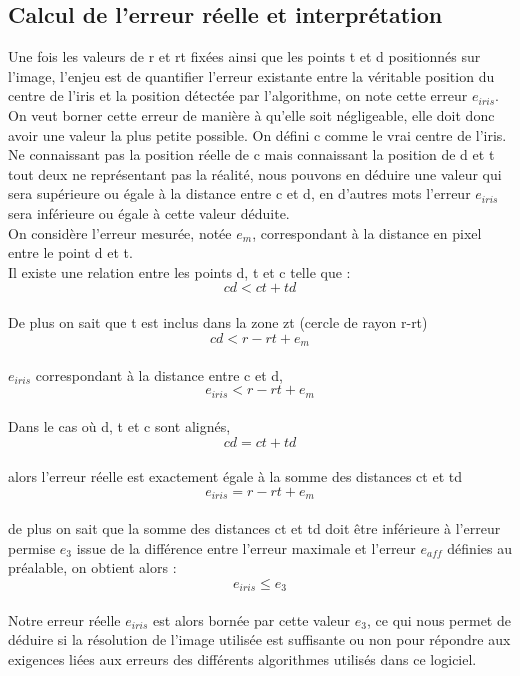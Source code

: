 \documentclass[a4paper, 12pt]{report}
\begin{document}
\subsection{Calcul de l'erreur réelle et interprétation}
Une fois les valeurs de r et rt fixées ainsi que les points t et d positionnés sur l'image, l'enjeu est de quantifier l'erreur existante entre la véritable position du centre de l'iris et la position détectée par l'algorithme, on note cette erreur $e_{iris}$. On veut borner cette erreur de manière à qu'elle soit négligeable, elle doit donc avoir une valeur la plus petite possible. On défini c comme le vrai centre de l'iris. Ne connaissant pas la position réelle de c mais connaissant la position de d et t tout deux ne représentant pas la réalité, nous pouvons en déduire une valeur qui sera supérieure ou égale à la distance entre c et d, en d'autres mots l'erreur $e_{iris}$ sera inférieure ou égale à cette valeur déduite.\\ 
On considère l'erreur mesurée, notée $e_{m}$, correspondant à la distance en pixel entre le point d et t.\\ 
Il existe une relation entre les points d, t et c telle que : \\
$$cd < ct + td $$\\
De plus on sait que t est inclus dans la zone zt (cercle de rayon r-rt)\\
$$cd < r - rt + e_{m}$$ \\
$e _{iris}$ correspondant à la distance entre c et d,\\
$$e_{iris} < r - rt + e_{m}$$ \\
Dans le cas où d, t et c sont alignés,\\
$$cd = ct + td$$ \\
alors l'erreur réelle est exactement égale à la somme des distances ct et td\\
$$e_{iris} = r - rt + e_{m}$$ \\
de plus on sait que la somme des distances ct et td doit être inférieure à l'erreur permise $e_{3}$ issue de la différence entre l'erreur maximale et l'erreur $e_{aff}$ définies au préalable, on obtient alors : \\ 
$$e_{iris} \leq e_{3} $$ \\
Notre erreur réelle $e_{iris}$ est alors bornée par cette valeur $e_{3}$, ce qui nous permet de déduire si la résolution de l'image utilisée est suffisante ou non pour répondre aux exigences liées aux erreurs des différents algorithmes utilisés dans ce logiciel. 
\end{document}
